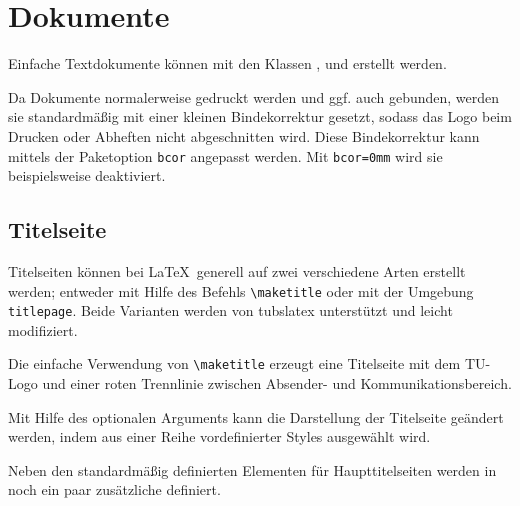 \chapter{Dokumente}

Einfache Textdokumente können mit den Klassen ,
 und  erstellt werden.


Da Dokumente normalerweise gedruckt werden und ggf. auch gebunden, werden
sie standardmäßig mit einer kleinen Bindekorrektur gesetzt, sodass das
Logo beim Drucken oder Abheften nicht abgeschnitten wird.
Diese Bindekorrektur kann mittels der Paketoption \texttt{bcor} angepasst werden.
Mit \texttt{bcor=0mm} wird sie beispielsweise deaktiviert.



\section{Titelseite}

Titelseiten können bei \LaTeX\ generell auf zwei verschiedene Arten erstellt
werden; entweder mit Hilfe des Befehls \lstinline{\maketitle} oder mit
der Umgebung \lstinline{titlepage}. Beide Varianten werden von tubslatex
unterstützt und leicht modifiziert.

\begin{Declaration}
\end{Declaration}

Die einfache Verwendung von \lstinline{\maketitle} erzeugt eine Titelseite
mit dem TU-Logo und einer roten Trennlinie zwischen Absender- und
Kommunikationsbereich.

Mit Hilfe des optionalen Arguments  kann die Darstellung
der Titelseite geändert werden, indem aus einer Reihe vordefinierter Styles
ausgewählt wird.\bigskip

Neben den standardmäßig definierten Elementen für Haupttitelseiten werden
in \tubslatex noch ein paar zusätzliche definiert.


